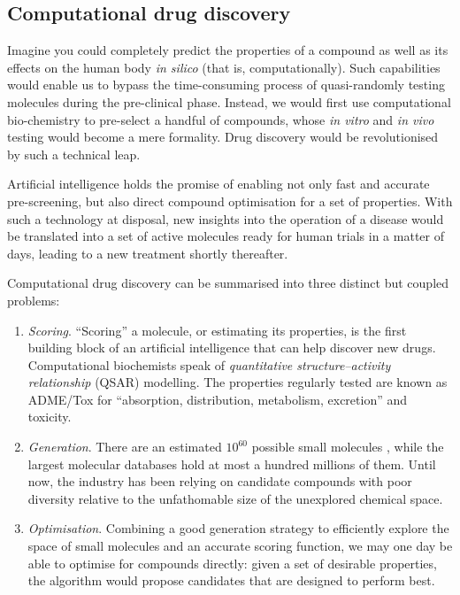 \documentclass[11pt]{article}
\numberwithin{equation}{subsection}
\begin{document}




\subsection{Computational drug discovery}
\label{sec:computational}

Imagine you could completely predict the properties of a compound as well as its effects on the human body \textit{in silico} (that is, computationally). Such capabilities would enable us to bypass the time-consuming process of quasi-randomly testing molecules during the pre-clinical phase. Instead, we would first use computational bio-chemistry to pre-select a handful of compounds, whose \textit{in vitro} and \textit{in vivo} testing would become a mere formality. Drug discovery would be revolutionised by such a technical leap.

Artificial intelligence holds the promise of enabling not only fast and accurate pre-screening, but also direct compound optimisation for a set of properties. With such a technology at disposal, new insights into the operation of a disease would be translated into a set of active molecules ready for human trials in a matter of days, leading to a new treatment shortly thereafter.

Computational drug discovery can be summarised into three distinct but coupled problems:
\begin{enumerate}
  \item \textit{Scoring}. ``Scoring'' a molecule, or estimating its properties, is the first building block of an artificial intelligence that can help discover new drugs. Computational biochemists speak of \textit{quantitative structure–activity relationship} (QSAR) modelling. The properties regularly tested are known as ADME/Tox for ``absorption, distribution, metabolism, excretion'' and toxicity.

  \item \textit{Generation}. There are an estimated $10^{60}$ possible small molecules \citep{chemicalspace}, while the largest molecular databases hold at most a hundred millions of them. Until now, the industry has been relying on candidate compounds with poor diversity relative to the unfathomable size of the unexplored chemical space.

  \item \textit{Optimisation}. Combining a good generation strategy to efficiently explore the space of small molecules and an accurate scoring function, we may one day be able to optimise for compounds directly: given a set of desirable properties, the algorithm would propose candidates that are designed to perform best.
\end{enumerate}
\end{document}
